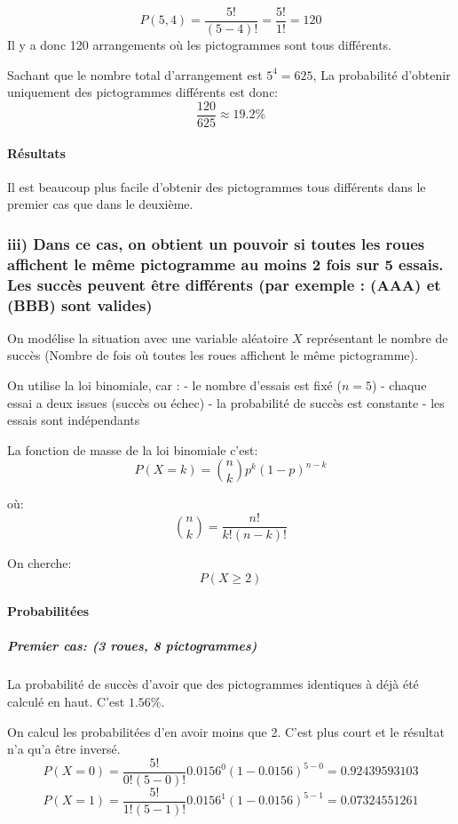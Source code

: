\[
P(5,4)=\frac{5!}{(5-4)!}=\frac{5!}{1!}=120
\] Il y a donc 120 arrangements où les pictogrammes sont tous
différents.

Sachant que le nombre total d'arrangement est \(5^4=625\), La
probabilité d'obtenir uniquement des pictogrammes différents est donc:
\[
\frac{120}{625} \approx 19.2\%
\]

\paragraph{Résultats}\label{ruxe9sultats}

Il est beaucoup plus facile d'obtenir des pictogrammes tous différents
dans le premier cas que dans le deuxième.

    \subsubsection{iii) Dans ce cas, on obtient un pouvoir si toutes les roues affichent le même
pictogramme au moins 2 fois sur 5 essais. Les succès peuvent être
différents (par exemple : (AAA) et (BBB) sont valides)}\label{iii}

On modélise la situation avec une variable aléatoire \(X\) représentant
le nombre de succès (Nombre de fois où toutes les roues affichent le
même pictogramme).

On utilise la loi binomiale, car : - le nombre d'essais est fixé
(\(n = 5\)) - chaque essai a deux issues (succès ou échec) - la
probabilité de succès est constante - les essais sont indépendants

La fonction de masse de la loi binomiale c'est: \[
P(X=k)=\binom{n}{k} p^k (1-p)^{n-k}
\]

où: \[
\binom{n}{k}=\frac{n!}{k!(n-k)!}
\]

On cherche: \[
P(X \ge 2)
\]

\paragraph{Probabilitées}\label{probabilituxe9es}

\subparagraph{Premier cas: (3 roues, 8
pictogrammes)}\label{premier-cas-3-roues-8-pictogrammes}

La probabilité de succès d'avoir que des pictogrammes identiques à déjà
été calculé en haut. C'est \(1.56\%\).

On calcul les probabilitées d'en avoir moins que 2. C'est plus court et
le résultat n'a qu'a être inversé. \[
P(X=0)=\frac{5!}{0!(5-0)!}0.0156^0(1-0.0156)^{5-0}=0.92439593103
\] \[
P(X=1)=\frac{5!}{1!(5-1)!}0.0156^1(1-0.0156)^{5-1}=0.07324551261
\]

